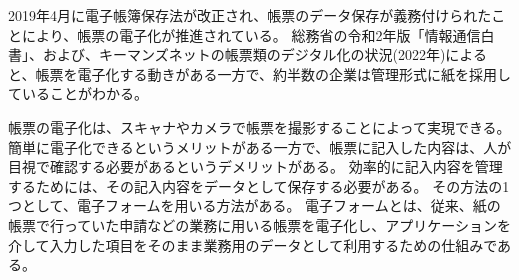 \documentclass[uplatex, report, a4j, 10pt]{jsbook}
\begin{document}





2019年4月に電子帳簿保存法が改正され、帳票のデータ保存が義務付けられたことにより、帳票の電子化が推進されている。
総務省の令和2年版「情報通信白書」、および、キーマンズネットの帳票類のデジタル化の状況(2022年)によると、帳票を電子化する動きがある一方で、約半数の企業は管理形式に紙を採用していることがわかる。

帳票の電子化は、スキャナやカメラで帳票を撮影することによって実現できる。
簡単に電子化できるというメリットがある一方で、帳票に記入した内容は、人が目視で確認する必要があるというデメリットがある。
効率的に記入内容を管理するためには、その記入内容をデータとして保存する必要がある。
その方法の1つとして、電子フォームを用いる方法がある。
電子フォームとは、従来、紙の帳票で行っていた申請などの業務に用いる帳票を電子化し、アプリケーションを介して入力した項目をそのまま業務用のデータとして利用するための仕組みである。
\end{document}
